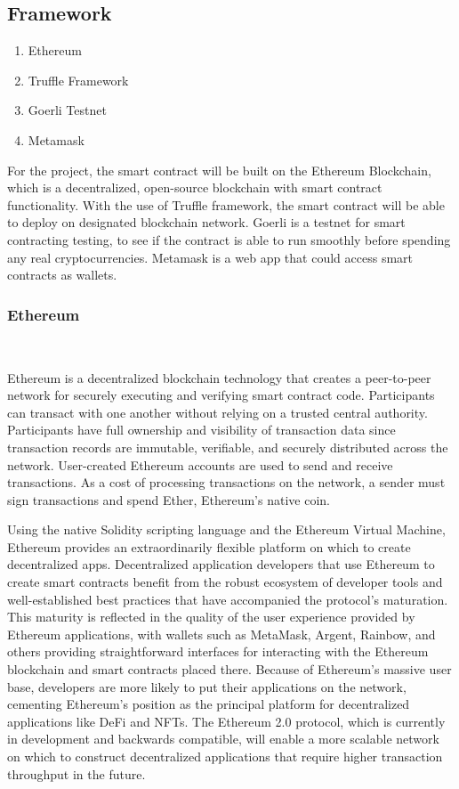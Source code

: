 \documentclass[10pt,twocolumn]{article}
\begin{document}
\subsection{Framework}
\begin{enumerate}
  \item Ethereum
  \item Truffle Framework
  \item Goerli Testnet
  \item Metamask
\end{enumerate}
    
For the project, the smart contract will be built on the Ethereum Blockchain, which is a decentralized, open-source blockchain with smart contract functionality. With the use of Truffle framework, the smart contract will be able to deploy on designated blockchain network. Goerli is a testnet for smart contracting testing, to see if the contract is able to run smoothly before spending any real cryptocurrencies. Metamask is a web app that could access smart contracts as wallets.

\subsubsection{Ethereum}\

Ethereum is a decentralized blockchain technology that creates a peer-to-peer network for securely executing and verifying smart contract code. Participants can transact with one another without relying on a trusted central authority. Participants have full ownership and visibility of transaction data since transaction records are immutable, verifiable, and securely distributed across the network. User-created Ethereum accounts are used to send and receive transactions. As a cost of processing transactions on the network, a sender must sign transactions and spend Ether, Ethereum's native coin.\cite{Eth}

Using the native Solidity scripting language and the Ethereum Virtual Machine, Ethereum provides an extraordinarily flexible platform on which to create decentralized apps. Decentralized application developers that use Ethereum to create smart contracts benefit from the robust ecosystem of developer tools and well-established best practices that have accompanied the protocol's maturation.
This maturity is reflected in the quality of the user experience provided by Ethereum applications, with wallets such as MetaMask, Argent, Rainbow, and others providing straightforward interfaces for interacting with the Ethereum blockchain and smart contracts placed there. Because of Ethereum's massive user base, developers are more likely to put their applications on the network, cementing Ethereum's position as the principal platform for decentralized applications like DeFi and NFTs. The Ethereum 2.0 protocol, which is currently in development and backwards compatible, will enable a more scalable network on which to construct decentralized applications that require higher transaction throughput in the future.\cite{Eth}
	
\end{document}
